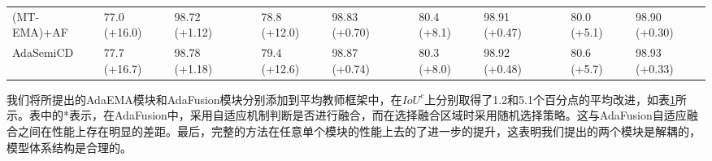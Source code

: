 \documentclass[lang=chs, degree=master, blindreview=false, adobe=false]{yanputhesis}
\begin{document}
\begin{table}[ht]
{\begin{tabular}{p{30mm}p{20mm}p{20mm}cp{20mm}p{20mm}cp{20mm}p{20mm}cp{20mm}p{20mm}}
  (MT-EMA)+AF &   77.0 {\color{red} (+16.0)} & 98.72 {\color{red} (+1.12)} && %
                  78.8 {\color{red} (+12.0)} & 98.83 {\color{red} (+0.70)} && %
                80.4 {\color{red} (+8.1)} & 98.91 {\color{red} (+0.47)} && %
                  80.0 {\color{red} (+5.1)} & 98.90 {\color{red} (+0.30)} \\ %
      AdaSemiCD   &   77.7 {\color{red} (+16.7)} & 98.78 {\color{red} (+1.18)} &&
                  79.4 {\color{red} (+12.6)} & 98.87 {\color{red} (+0.74)} &&
                  80.3 {\color{red} (+8.0)} & 98.92 {\color{red} (+0.48)} &&
                  80.6 {\color{red} (+5.7)} & 98.93 {\color{red} (+0.33)} \\
  \bottomrule
\end{tabular}
  }
\label{tab:AdaModule_ablation}
\end{table}

我们将所提出的AdaEMA模块和AdaFusion模块分别添加到平均教师框架中，在$IoU^c$上分别取得了1.2和5.1个百分点的平均改进，如表\ref{tab:AdaModule_ablation}所示。表中的*表示，在AdaFusion中，采用自适应机制判断是否进行融合，而在选择融合区域时采用随机选择策略。这与AdaFusion自适应融合之间在性能上存在明显的差距。最后，完整的方法在任意单个模块的性能上去的了进一步的提升，这表明我们提出的两个模块是解耦的，模型体系结构是合理的。
\end{document}
